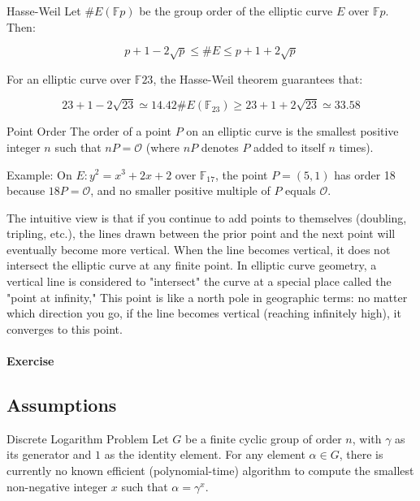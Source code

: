 \documentclass{article}
\begin{document}
\begin{theorem}{Hasse-Weil}{}
Let $\#E(\mathbb{F}{p})$ be the group order of the elliptic curve $E$ over $\mathbb{F}{p}$. Then:

        \begin{equation}
            p + 1 - 2 \sqrt{p} \leq \#E \leq p + 1 + 2 \sqrt{p}
        \end{equation}
\end{theorem}

For an elliptic curve over $\mathbb{F}{23}$, the Hasse-Weil theorem guarantees that: 

\begin{equation*}
23 + 1 - 2 \sqrt{23} \simeq 14.42 \#E(\mathbb{F}_{23}) \geq 23 + 1 + 2 \sqrt{23} \simeq 33.58
\end{equation*}

\begin{definition}{Point Order}{}
The order of a point $P$ on an elliptic curve is the smallest positive integer $n$ such that $nP = \mathcal{O}$ (where $nP$ denotes $P$ added to itself $n$ times).
\end{definition}

Example: On $E: y^2 = x^3 + 2x + 2$ over $\mathbb{F}_{17}$, the point $P = (5, 1)$ has order 18 because $18P = \mathcal{O}$, and no smaller positive multiple of $P$ equals $\mathcal{O}$.

The intuitive view is that if you continue to add points to themselves (doubling, tripling, etc.), the lines drawn between the prior point and the next point will eventually become more vertical. When the line becomes vertical, it does not intersect the elliptic curve at any finite point. In elliptic curve geometry, a vertical line is considered to "intersect" the curve at a special place called the "point at infinity," This point is like a north pole in geographic terms: no matter which direction you go, if the line becomes vertical (reaching infinitely high), it converges to this point.

\paragraph{Exercise}

\subsection{Assumptions}

\begin{assumption}{Discrete Logarithm Problem}{} Let $G$ be a finite cyclic group of order $n$, with $\gamma$ as its generator and $1$ as the identity element. For any element $\alpha \in G$, there is currently no known efficient (polynomial-time) algorithm to compute the smallest non-negative integer $x$ such that $\alpha = \gamma^{x}$.
\end{assumption}
\end{document}
